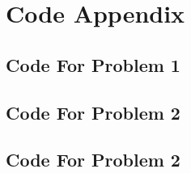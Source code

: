 \documentclass[a4paper,10pt, english]{article}
\begin{document}
\section*{Code Appendix}
\subsection*{Code For Problem 1}

\subsection*{Code For Problem 2}

\subsection*{Code For Problem 2}

\end{document}

